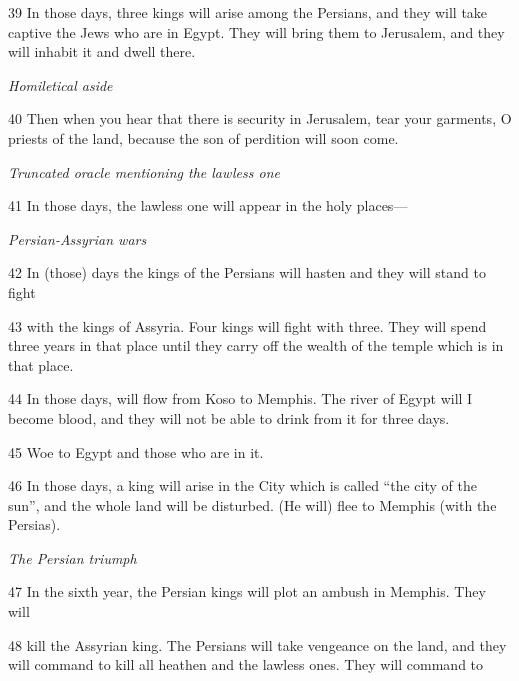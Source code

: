 \par 39 In those days, three kings will arise among the Persians, and they will take captive the Jews who are in Egypt. They will bring them to Jerusalem, and they will inhabit it and dwell there. 

\par \textit{Homiletical aside}

\par 40 Then when you hear that there is security in Jerusalem, tear your garments, O priests of the land, because the son of perdition will soon come.

\par \textit{Truncated oracle mentioning the lawless one}

\par 41 In those days, the lawless one will appear in the holy places—

\par \textit{Persian-Assyrian wars}

\par 42 In (those) days the kings of the Persians will hasten and they will stand to fight

\par 43 with the kings of Assyria. Four kings will fight with three. They will spend three years in that place until they carry off the wealth of the temple which is in that place.

\par 44 In those days, will flow from Koso to Memphis. The river of Egypt will I become blood, and they will not be able to drink from it for three days.

\par 45 Woe to Egypt and those who are in it.

\par 46 In those days, a king will arise in the City which is called “the city of the sun”, and the whole land will be disturbed. (He will) flee to Memphis (with the Persias).

\par \textit{The Persian triumph}

\par 47 In the sixth year, the Persian kings will plot an ambush in Memphis. They will

\par 48 kill the Assyrian king. The Persians will take vengeance on the land, and they will command to kill all heathen and the lawless ones. They will command to


